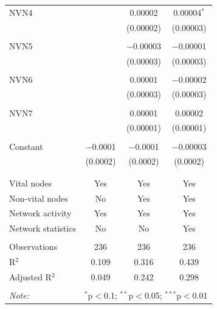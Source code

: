 \begin{table}[!htbp]
\begin{tabular}{@{\extracolsep{5pt}}lccc}
 NVN4 &  & 0.00002 & 0.00004$^{*}$ \\ 
  &  & (0.00002) & (0.00003) \\ 
  & & & \\ 
 NVN5 &  & $-$0.00003 & $-$0.00001 \\ 
  &  & (0.00003) & (0.00003) \\ 
  & & & \\ 
 NVN6 &  & 0.00001 & $-$0.00002 \\ 
  &  & (0.00003) & (0.00003) \\ 
  & & & \\ 
 NVN7 &  & 0.00001 & 0.00002 \\ 
  &  & (0.00001) & (0.00001) \\ 
  & & & \\ 
 Constant & $-$0.0001 & $-$0.0001 & $-$0.00003 \\ 
  & (0.0002) & (0.0002) & (0.0002) \\ 
  & & & \\ 
\hline \\[-1.8ex] 
Vital nodes & Yes & Yes & Yes \\ 
Non-vital nodes & No & Yes & Yes \\ 
Network activity & Yes & Yes & Yes \\ 
Network statistics & No & No & Yes \\ 
\hline &  &  &  \\ 
Observations & 236 & 236 & 236 \\ 
R$^{2}$ & 0.109 & 0.316 & 0.439 \\ 
Adjusted R$^{2}$ & 0.049 & 0.242 & 0.298 \\ 
\hline 
\hline \\[-1.8ex] 
\textit{Note:}  & \multicolumn{3}{r}{$^{*}$p$<$0.1; $^{**}$p$<$0.05; $^{***}$p$<$0.01} \\ 
\end{tabular} 
\end{table} 
